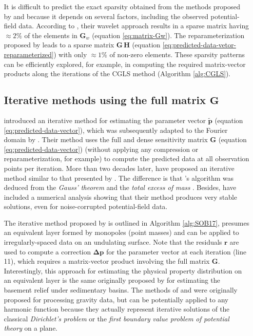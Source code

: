 It is difficult to predict the exact sparsity obtained from the methods proposed by \citet{li-oldenburg2010} and \citet{barnes-lumley2011} 
because it depends on several factors, including the observed potential-field data.
According to \citet{li-oldenburg2010}, their wavelet approach results in a sparse matrix having $\approx 2\%$ 
of the elements in $\mathbf{G}_{w}$ (equation \ref{eq:matrix-Gw}).
The reparameterization proposed by \citet{barnes-lumley2011} leads to a sparse matrix $\mathbf{G \, H}$ (equation \ref{eq:predicted-data-vetor-reparameterized})
with only $\approx 1\%$ of non-zero elements.
These sparsity patterns can be efficiently explored, for example, in computing the required matrix-vector products
along the iterations of the CGLS method (Algorithm \ref{alg:CGLS}).


\subsection{Iterative methods using the full matrix $\mathbf{G}$}

\citet{xia-sprowl1991} introduced an iterative method for estimating the parameter vector $\tilde{\mathbf{p}}$ 
(equation \ref{eq:predicted-data-vector}), which was subsequently adapted to the Fourier domain by \citet{xia-etal1993}.
Their method uses the full and dense sensitivity matrix $\mathbf{G}$ (equation \ref{eq:predicted-data-vector})
(without applying any compression or reparameterization, for example) to compute the predicted data
at all observation points per iteration.
More than two decades later, \cite{siqueira-etal2017} have proposed an iterative method similar to that presented by \citet{xia-sprowl1991}.
The difference is that \citeauthor{siqueira-etal2017}'s algorithm was deduced from 
the \textit{Gauss' theorem} \cite[e.g.,][p. 43]{kellogg1967} and the \textit{total excess of mass} \cite[e.g.,][p. 60]{blakely1996}.
Besides, \citet{siqueira-etal2017} have included a numerical analysis showing that their method produces very stable solutions, 
even for noise-corrupted potential-field data.

The iterative method proposed by \citet{siqueira-etal2017} is outlined in Algorithm \ref{alg:SOB17},
presumes an equivalent layer formed by monopoles (point masses) and can be applied to
irregularly-spaced data on an undulating surface.
Note that the residuals $\mathbf{r}$ are used to compute a correction $\boldsymbol{\Delta}\mathbf{p}$
for the parameter vector at each iteration (line 11), which requires a matrix-vector product involving the 
full matrix $\mathbf{G}$.
Interestingly, this approach for estimating the physical property distribution on an equivalent layer 
is the same originally proposed by \citet{bott1960} for estimating the basement relief under sedimentary basins.
The methods of \citet{xia-sprowl1991} and \citet{siqueira-etal2017} were originally proposed for processing gravity data,
but can be potentially applied to any harmonic function because they actually represent iterative solutions of the 
classical \textit{Dirichlet’s problem} or the \textit{first boundary value problem of potential theory} 
\cite[][ p. 236]{kellogg1967} on a plane.

